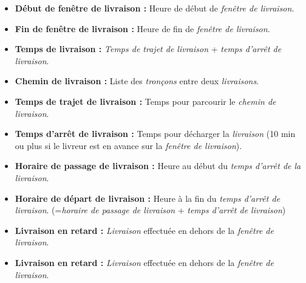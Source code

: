 \documentclass[10pt,a4paper]{book}
\begin{document}
\begin{itemize}
\item \textbf{Début de fenêtre de livraison :} Heure de début de \textit{fenêtre de livraison}. \vskip1mm
\item \textbf{Fin de fenêtre de livraison :} Heure de fin de \textit{fenêtre de livraison}. \vskip1mm
\item \textbf{Temps de livraison :} \textit{Temps de trajet de livraison} + \textit{temps d'arrêt de livraison}. \vskip1mm
\item \textbf{Chemin de livraison :} Liste des \textit{tronçons} entre deux \textit{livraisons}. \vskip1mm
\item \textbf{Temps de trajet de livraison :} Temps pour parcourir le \textit{chemin de livraison}. \vskip1mm
\item \textbf{Temps d'arrêt de livraison :} Temps pour décharger la \textit{livraison} (10 min ou plus si le livreur est en avance sur la \textit{fenêtre de livraison}). \vskip1mm
\item \textbf{Horaire de passage de livraison :} Heure au début du \textit{temps d'arrêt de la livraison}. \vskip1mm
\item \textbf{Horaire de départ de livraison :} Heure à la fin du \textit{temps d'arrêt de livraison}. (=\textit{horaire de passage de livraison} + \textit{temps d'arrêt de livraison}) \vskip1mm
\item \textbf{Livraison en retard :} \textit{Livraison} effectuée en dehors de la \textit{fenêtre de livraison}. \vskip1mm
\item \textbf{Livraison en retard :} \textit{Livraison} effectuée en dehors de la \textit{fenêtre de livraison}. \vskip1mm
\end{itemize}
\end{document}
